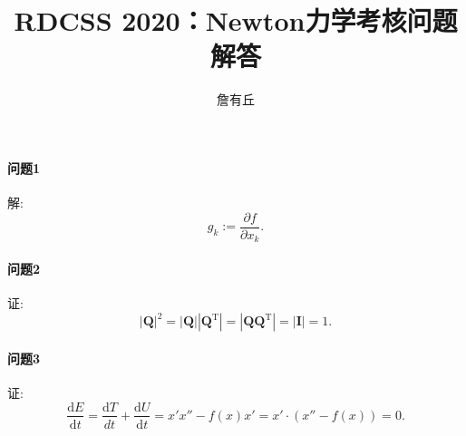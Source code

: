 \documentclass{article}
\title{RDCSS 2020：Newton力学考核问题解答}
\author{詹有丘}
\begin{document}
\maketitle

\paragraph{问题1}
解:$$g_k:=\frac{\partial f}{\partial x_k}.$$

\paragraph{问题2}
证:$$\left|\mathbf Q\right|^2=\left|\mathbf Q\right|\left|\mathbf Q^\mathrm T\right|=\left|\mathbf Q\mathbf Q^\mathrm T\right|=\left|\mathbf I\right|=1.$$

\paragraph{问题3}
证:$$\frac{\mathrm dE}{\mathrm dt}=\frac{\mathrm dT}{dt}+\frac{\mathrm dU}{\mathrm dt}=x'x''-f\left(x\right)x'=x'\cdot\left(x''-f\left(x\right)\right)=0.$$
\end{document}
